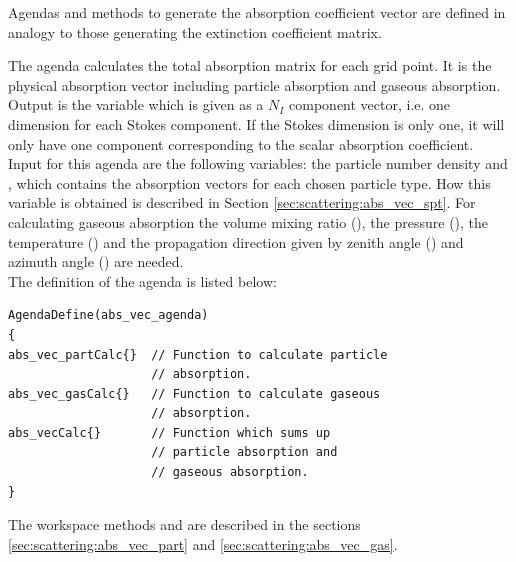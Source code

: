 \label{sec:scattering:abs_vec}

Agendas and methods to generate the absorption coefficient vector are
defined in analogy to those generating the extinction coefficient matrix.

\label{sec:scattering:abs_vec_agenda}

The agenda  calculates the total absorption
matrix \AbsVec{}
for each grid point. It is the physical absorption vector including
particle absorption and gaseous absorption.\\
Output is the variable  which is given
as a $N_I$ component vector, i.e. one dimension for each Stokes component. If the
Stokes dimension is only one, it will only have one component
corresponding to the scalar absorption coefficient. \\
Input for this agenda are the following variables:
the particle number density  and 
, which contains the absorption vectors  for
each chosen particle type. How this variable is obtained
is described in Section \ref{sec:scattering:abs_vec_spt}. For calculating 
gaseous absorption the volume mixing ratio (), the
pressure  (), the temperature  () and the
propagation direction given by zenith angle () and
azimuth angle () are needed.\\
The definition of the agenda is listed below:

\vspace{2ex} 
\begin{minipage}[h]{.9\hsize}
\begin{verbatim}
AgendaDefine(abs_vec_agenda)
{
abs_vec_partCalc{}  // Function to calculate particle
                    // absorption.
abs_vec_gasCalc{}   // Function to calculate gaseous
                    // absorption.
abs_vecCalc{}       // Function which sums up 
                    // particle absorption and
                    // gaseous absorption.
}
\end{verbatim}
\end{minipage}
\vspace{2ex} 

\noindent
The workspace methods  and
 are described in the sections
\ref{sec:scattering:abs_vec_part} and
\ref{sec:scattering:abs_vec_gas}. 


